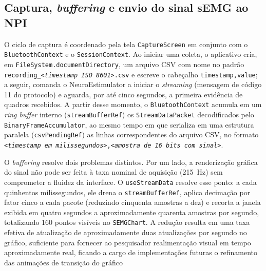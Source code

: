 \subsection{Captura, \textit{buffering} e envio do sinal sEMG ao NPI}\label{subsec:IRISMobileCaptura}

O ciclo de captura é coordenado pela tela \texttt{CaptureScreen} em conjunto com o \texttt{BluetoothContext} e o \texttt{SessionContext}. Ao iniciar uma coleta, o aplicativo cria, em \texttt{FileSystem.documentDirectory}, um arquivo CSV com nome no padrão \texttt{recording\_<\textit{timestamp ISO 8601}>.csv} e escreve o cabeçalho \texttt{timestamp,value}; a seguir, comanda o NeuroEstimulator a iniciar o \textit{streaming} (mensagem de código 11 do protocolo) e aguarda, por até cinco segundos, a primeira evidência de quadros recebidos. A partir desse momento, o \texttt{BluetoothContext} acumula em um \textit{ring buffer} interno (\texttt{streamBufferRef}) os \texttt{StreamDataPacket} decodificados pelo \texttt{BinaryFrameAccumulator}, ao mesmo tempo em que serializa em uma estrutura paralela (\texttt{csvPendingRef}) as linhas correspondentes do arquivo CSV, no formato \texttt{<\textit{timestamp em milissegundos}>,<\textit{amostra de 16 \textit{bits} com sinal}>}.

O \textit{buffering} resolve dois problemas distintos. Por um lado, a renderização gráfica do sinal não pode ser feita à taxa nominal de aquisição (215~Hz) sem comprometer a fluidez da interface. O \texttt{useStreamData} resolve esse ponto: a cada quinhentos milissegundos, ele drena o \texttt{streamBufferRef}, aplica decimação por fator cinco a cada pacote (reduzindo cinquenta amostras a dez) e recorta a janela exibida em quatro segundos a aproximadamente quarenta amostras por segundo, totalizando 160 pontos visíveis no \texttt{SEMGChart}. A redução resulta em uma taxa efetiva de atualização de aproximadamente duas atualizações por segundo no gráfico, suficiente para fornecer ao pesquisador realimentação visual em tempo aproximadamente real, ficando a cargo de implementações futuras o refinamento das animações de transição do gráfico

